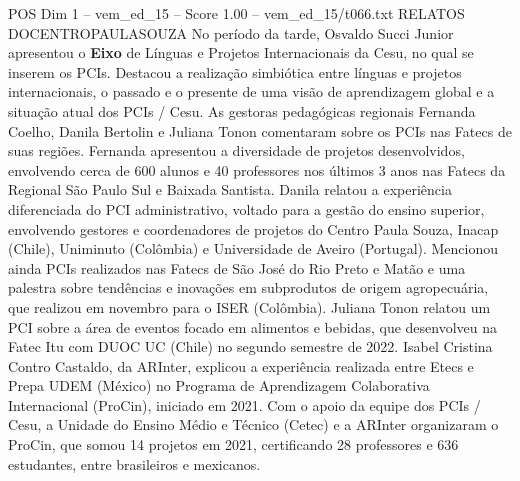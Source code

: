 \begin{textsample}{POS Dim 1 – vem\_ed\_15 – Score 1.00 – vem\_ed\_15/t066.txt}  \label{ex:f1_pos_043}
RELATOS DOCENTROPAULASOUZA No período da tarde, Osvaldo Succi Junior apresentou o \textbf{Eixo} de Línguas e Projetos Internacionais da Cesu, no qual se inserem os PCIs.
Destacou a realização simbiótica entre línguas e projetos internacionais, o passado e o presente de uma visão de aprendizagem global e a situação atual dos PCIs / Cesu.
As gestoras pedagógicas regionais Fernanda Coelho, Danila Bertolin e Juliana Tonon comentaram sobre os PCIs nas Fatecs de suas regiões.
Fernanda apresentou a diversidade de projetos desenvolvidos, envolvendo cerca de 600 alunos e 40 professores nos últimos 3 anos nas Fatecs da Regional São Paulo Sul e Baixada Santista.
Danila relatou a experiência diferenciada do PCI administrativo, voltado para a gestão do ensino superior, envolvendo gestores e coordenadores de projetos do Centro Paula Souza, Inacap (Chile), Uniminuto (Colômbia) e Universidade de Aveiro (Portugal).
Mencionou ainda PCIs realizados nas Fatecs de São José do Rio Preto e Matão e uma palestra sobre tendências e inovações em subprodutos de origem agropecuária, que realizou em novembro para o ISER (Colômbia).
Juliana Tonon relatou um PCI sobre a área de eventos focado em alimentos e bebidas, que desenvolveu na Fatec Itu com DUOC UC (Chile) no segundo semestre de 2022.
Isabel Cristina Contro Castaldo, da ARInter, explicou a experiência realizada entre Etecs e Prepa UDEM (México) no Programa de Aprendizagem Colaborativa Internacional (ProCin), iniciado em 2021.
Com o apoio da equipe dos PCIs / Cesu, a Unidade do Ensino Médio e Técnico (Cetec) e a ARInter organizaram o ProCin, que somou 14 projetos em 2021, certificando 28 professores e 636 estudantes, entre brasileiros e mexicanos.

\end{textsample}
